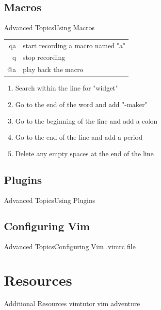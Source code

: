 \documentclass{beamer}
\begin{document}
\subsection{Macros}
\begin{frame}[t]{Advanced Topics}{Using Macros}

    \begin{table}[htpb]
        \centering
        \begin{tabular}{r|l}
            qa & start recording a macro named "a" \\
            q  & stop recording \\
            @a & play back the macro \\
        \end{tabular}
    \end{table}

    \begin{enumerate}
        \item Search within the line for "widget" \\
        \item Go to the end of the word and add "-maker" \\
        \item Go to the beginning of the line and add a colon \\
        \item Go to the end of the line and add a period \\
        \item Delete any empty spaces at the end of the line \\
    \end{enumerate}
\end{frame}



\subsection{Plugins}
\begin{frame}[t]{Advanced Topics}{Using Plugins}
    
\end{frame}




\subsection{Configuring Vim}
\begin{frame}[t]{Advanced Topics}{Configuring Vim}
    .vimrc file
    
\end{frame}



\section{Resources}
\begin{frame} {Additional Resources}
    vimtutor
    vim adventure


\end{frame}
\end{document}
